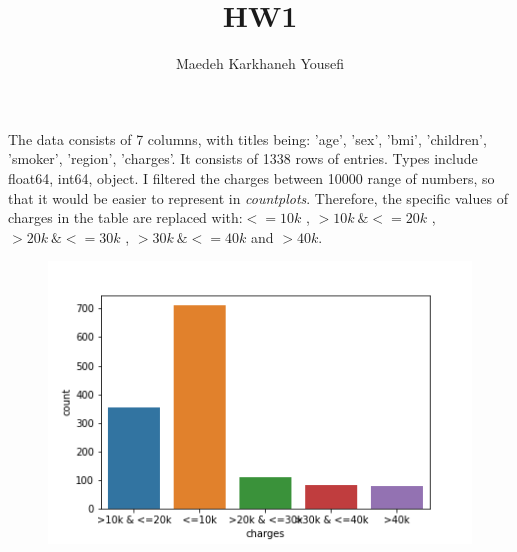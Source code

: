 \documentclass[12pt]{article}
\title{HW1}
\author{Maedeh Karkhaneh Yousefi}
\begin{document}
\maketitle
The data consists of 7 columns, with titles being: 'age', 'sex', 'bmi', 'children', 'smoker', 'region', 'charges'.
It consists of 1338 rows of entries. Types include float64, int64, object. I filtered the charges between 10000 range of numbers, so that it would be easier to represent in \textit{countplots}. Therefore, the specific values of charges in the table are replaced with:$ <=10k$ , $ >10k\ \& <=20k$ ,  $>20k\ \& <=30k$ , $>30k\ \& <=40k$ and  $ >40k $.  
\begin{figure}[H]
\centering
\includegraphics[width=\textwidth]{charges_dist.png}
\label{mesh:fig1}
\caption{}
\end{figure}
\end{document}
